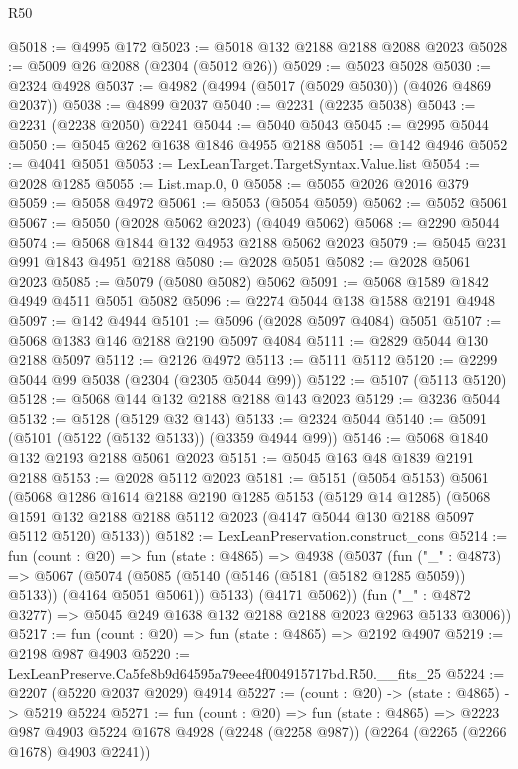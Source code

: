 \begin{lexlean}{R50}
\begin{coremodule}
@5018 := @4995 @172
@5023 := @5018 @132 @2188 @2188 @2088 @2023
@5028 := @5009 @26 @2088 (@2304 (@5012 @26))
@5029 := @5023 @5028
@5030 := @2324 @4928
@5037 := @4982 (@4994 (@5017 (@5029 @5030)) (@4026 @4869 @2037))
@5038 := @4899 @2037
@5040 := @2231 (@2235 @5038)
@5043 := @2231 (@2238 @2050) @2241
@5044 := @5040 @5043
@5045 := @2995 @5044
@5050 := @5045 @262 @1638 @1846 @4955 @2188
@5051 := @142 @4946
@5052 := @4041 @5051
@5053 := LexLeanTarget.TargetSyntax.Value.list
@5054 := @2028 @1285
@5055 := List.map.{0, 0}
@5058 := @5055 @2026 @2016 @379
@5059 := @5058 @4972
@5061 := @5053 (@5054 @5059)
@5062 := @5052 @5061
@5067 := @5050 (@2028 @5062 @2023) (@4049 @5062)
@5068 := @2290 @5044
@5074 := @5068 @1844 @132 @4953 @2188 @5062 @2023
@5079 := @5045 @231 @991 @1843 @4951 @2188
@5080 := @2028 @5051
@5082 := @2028 @5061 @2023
@5085 := @5079 (@5080 @5082) @5062
@5091 := @5068 @1589 @1842 @4949 @4511 @5051 @5082
@5096 := @2274 @5044 @138 @1588 @2191 @4948
@5097 := @142 @4944
@5101 := @5096 (@2028 @5097 @4084) @5051
@5107 := @5068 @1383 @146 @2188 @2190 @5097 @4084
@5111 := @2829 @5044 @130 @2188 @5097
@5112 := @2126 @4972
@5113 := @5111 @5112
@5120 := @2299 @5044 @99 @5038 (@2304 (@2305 @5044 @99))
@5122 := @5107 (@5113 @5120)
@5128 := @5068 @144 @132 @2188 @2188 @143 @2023
@5129 := @3236 @5044
@5132 := @5128 (@5129 @32 @143)
@5133 := @2324 @5044
@5140 := @5091 (@5101 (@5122 (@5132 @5133)) (@3359 @4944 @99))
@5146 := @5068 @1840 @132 @2193 @2188 @5061 @2023
@5151 := @5045 @163 @48 @1839 @2191 @2188
@5153 := @2028 @5112 @2023
@5181 := @5151
    (@5054 @5153)
    @5061
    (@5068
      @1286
      @1614
      @2188
      @2190
      @1285
      @5153
      (@5129 @14 @1285)
      (@5068 @1591 @132 @2188 @2188 @5112 @2023 (@4147 @5044 @130 @2188 @5097 @5112 @5120) @5133))
@5182 := LexLeanPreservation.construct_cons
@5214 := fun (count : @20) =>
  fun (state : @4865) =>
  @4938
    (@5037
      (fun ("_" : @4873) =>
      @5067
        (@5074 (@5085 (@5140 (@5146 (@5181 (@5182 @1285 @5059)) @5133)) (@4164 @5051 @5061)) @5133)
        (@4171 @5062))
      (fun ("_" : @4872 @3277) => @5045 @249 @1638 @132 @2188 @2188 @2023 @2963 @5133 @3006))
@5217 := fun (count : @20) => fun (state : @4865) => @2192 @4907
@5219 := @2198 @987 @4903
@5220 := LexLeanPreserve.Ca5fe8b9d64595a79eee4f004915717bd.R50.__fits_25
@5224 := @2207 (@5220 @2037 @2029) @4914
@5227 := (count : @20) -> (state : @4865) -> @5219 @5224
@5271 := fun (count : @20) =>
  fun (state : @4865) =>
  @2223
    @987
    @4903
    @5224
    @1678
    @4928
    (@2248 (@2258 @987))
    (@2264 (@2265 (@2266 @1678) @4903 @2241))

\end{coremodule}
\end{lexlean}
